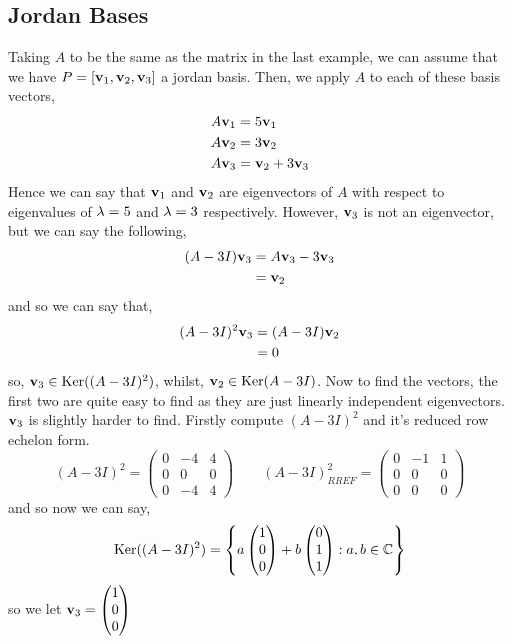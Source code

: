 \documentclass{article}
\begin{document}
\subsection{Jordan Bases}

\begin{eg}
  Taking $A$ to be the same as the matrix in the last example, we can assume that we have $P = [\boldsymbol{\mathbf{v}}_1, \boldsymbol{\mathbf{v}}_2, \boldsymbol{\mathbf{v}}_3]$ a jordan basis. Then, we apply $A$ to each of these basis vectors,
  \begin{align*}
    A\boldsymbol{\mathbf{v}}_1 &= 5\boldsymbol{\mathbf{v}}_1\\
    A\boldsymbol{\mathbf{v}}_2 &= 3\boldsymbol{\mathbf{v}}_2\\
    A\boldsymbol{\mathbf{v}}_3 &= \boldsymbol{\mathbf{v}}_2 + 3\boldsymbol{\mathbf{v}}_3\\
  \end{align*}
  Hence we can say that $\boldsymbol{\mathbf{v}}_1$ and $\boldsymbol{\mathbf{v}}_2$ are eigenvectors of $A$ with respect to eigenvalues of $\lambda = 5$ and $\lambda=3$ respectively. However, $\boldsymbol{\mathbf{v}}_3$ is not an eigenvector, but we can say the following,
  \begin{align*}
    (A - 3I)\boldsymbol{\mathbf{v}}_3 &= A\boldsymbol{\mathbf{v}}_3 - 3\boldsymbol{\mathbf{v}}_3\\
    &= \boldsymbol{\mathbf{v}}_2
  \end{align*}
  and so we can say that,
  \begin{align*}
    (A - 3I)^2\boldsymbol{\mathbf{v}}_3 &= (A - 3I)\boldsymbol{\mathbf{v}}_2\\
    &= 0
  \end{align*}
  so, $\boldsymbol{\mathbf{v}}_3 \in \operatorname{Ker} ((A - 3I)^2)$, whilst, $\boldsymbol{\mathbf{v}}_2 \in \operatorname{Ker} (A - 3I)$. Now to find the vectors, the first two are quite easy to find as they are just linearly independent eigenvectors. $\boldsymbol{\mathbf{v}}_3$ is slightly harder to find. Firstly compute $(A - 3I)^2$ and it's reduced row echelon form.
  $$ (A - 3I)^2 = \begin{pmatrix}
    0 & -4 & 4 \\ 0 & 0 & 0\\ 0 & -4 & 4
  \end{pmatrix} \qquad (A - 3I)^2_{RREF} = \begin{pmatrix}
    0 & -1 & 1 \\ 0 & 0 & 0\\ 0 & 0 & 0
  \end{pmatrix} $$
  and so now we can say,
  $$ \operatorname{Ker}((A - 3I)^2) = \left\{ a \begin{pmatrix}
    1\\0\\0
  \end{pmatrix} + b \begin{pmatrix}
    0\\1\\1
  \end{pmatrix} : a,b \in \mathbb{C} \right\} $$
  so we let $\displaystyle{\boldsymbol{\mathbf{v}}_3 = \begin{pmatrix}
    1\\0\\0
  \end{pmatrix}}$


\end{eg}
\end{document}
